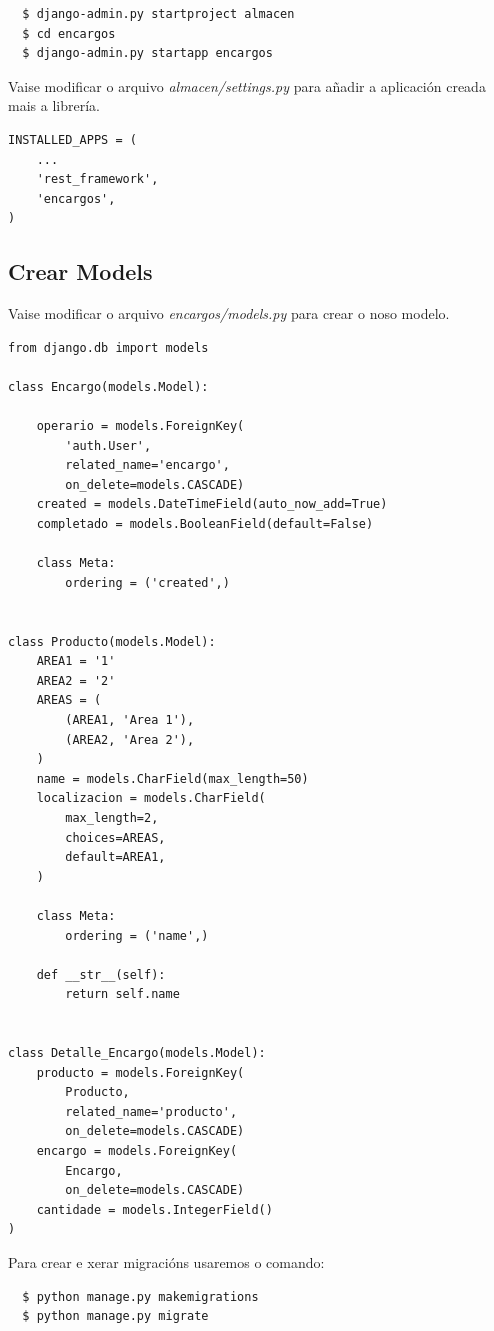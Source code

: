 \documentclass[11pt,twoside]{book}
\begin{document}
\begin{verbatim}
  $ django-admin.py startproject almacen
  $ cd encargos
  $ django-admin.py startapp encargos
\end{verbatim}

Vaise modificar o arquivo \textit{almacen/settings.py} para añadir a aplicación creada mais a librería.

\begin{verbatim}
INSTALLED_APPS = (
    ...
    'rest_framework',
    'encargos',
)
\end{verbatim}

\subsection{Crear Models}

Vaise modificar o arquivo \textit{encargos/models.py} para crear o noso modelo.

\begin{verbatim}
from django.db import models

class Encargo(models.Model):

    operario = models.ForeignKey(
        'auth.User',
        related_name='encargo',
        on_delete=models.CASCADE)
    created = models.DateTimeField(auto_now_add=True)
    completado = models.BooleanField(default=False)

    class Meta:
        ordering = ('created',)


class Producto(models.Model):
    AREA1 = '1'
    AREA2 = '2'
    AREAS = (
        (AREA1, 'Area 1'),
        (AREA2, 'Area 2'),
    )
    name = models.CharField(max_length=50)
    localizacion = models.CharField(
        max_length=2,
        choices=AREAS,
        default=AREA1, 
    )

    class Meta:
        ordering = ('name',)

    def __str__(self):
        return self.name


class Detalle_Encargo(models.Model):
    producto = models.ForeignKey(
        Producto, 
        related_name='producto', 
        on_delete=models.CASCADE)
    encargo = models.ForeignKey(
        Encargo, 
        on_delete=models.CASCADE)
    cantidade = models.IntegerField()
)
\end{verbatim}

Para crear e xerar migracións usaremos o comando:

\begin{verbatim}
  $ python manage.py makemigrations 
  $ python manage.py migrate
\end{verbatim}
\end{document}
